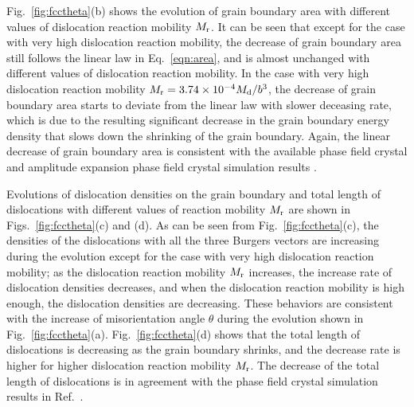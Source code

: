 Fig.~\ref{fig:fcctheta}(b) shows the evolution of grain boundary area with different values of dislocation reaction mobility $M_{\rm r}$. It can be seen that except for the case with very high dislocation reaction mobility, the decrease of grain boundary area still follows the linear law in Eq.~\eqref{eqn:area}, and is almost unchanged with different values of dislocation reaction mobility. In the case with very high dislocation reaction mobility $M_{\rm r}=  3.74\times10^{-4}M_{\rm d}/b^3$, the decrease of grain boundary area starts to deviate from the linear law with slower deceasing rate, which is due to the resulting significant decrease in the grain boundary energy density that slows down the shrinking of the grain boundary. Again, the linear decrease of grain boundary area is consistent with the available phase field crystal and amplitude expansion phase field crystal simulation results \cite{yamanaka2017phase,salvalaglio2018defects}.




Evolutions of dislocation densities on the grain boundary and total length of dislocations with different values of reaction mobility $M_{\rm r}$ are shown in Figs.~\ref{fig:fcctheta}(c) and (d). As can be seen from  Fig.~\ref{fig:fcctheta}(c),  the densities of the dislocations with all the three Burgers vectors are increasing during the evolution except for the case with very high dislocation reaction mobility;
as the dislocation reaction mobility $M_{\rm r}$ increases, the increase rate of dislocation densities decreases, and when the dislocation reaction mobility is high enough, the dislocation densities are decreasing.
 These behaviors are consistent with the increase of misorientation angle $\theta$ during the evolution shown in Fig.~\ref{fig:fcctheta}(a).
Fig.~\ref{fig:fcctheta}(d) shows that
the total length of dislocations is decreasing as the grain boundary shrinks, and the decrease rate is higher for higher dislocation reaction mobility  $M_{\rm r}$.
 The decrease of the total length of dislocations is in agreement with the phase field crystal simulation results in Ref.~\cite{yamanaka2017phase}.

%








